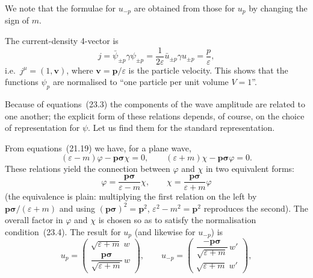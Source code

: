 We note that the formulae for $u_{-p}$ are obtained from those for $u_p$ by changing the sign of $m$.

The current-density 4-vector is
\begin{equation}
j = \bar\psi_{\pm p}\gamma\psi_{\pm p} = \frac{1}{2\varepsilon}\bar u_{\pm p}\gamma u_{\pm p} = \frac{p}{\varepsilon},
\tag{23.6}
\end{equation}
i.e.\ $j^\mu = (1, \mathbf{v})$, where $\mathbf{v} = \mathbf{p}/\varepsilon$ is the particle velocity. This shows that the functions $\psi_p$ are normalised to ``one particle per unit volume $V = 1$''.

Because of equations~(23.3) the components of the wave amplitude are related to one another; the explicit form of these relations depends, of course, on the choice of representation for $\psi$. Let us find them for the standard representation.

From equations~(21.19) we have, for a plane wave,
\begin{equation}
(\varepsilon - m)\varphi - \mathbf{p}\boldsymbol{\sigma}\chi = 0,\qquad (\varepsilon + m)\chi - \mathbf{p}\boldsymbol{\sigma}\varphi = 0.
\tag{23.7}
\end{equation}
These relations yield the connection between $\varphi$ and $\chi$ in two equivalent forms:
\begin{equation}
\varphi = \frac{\mathbf{p}\boldsymbol{\sigma}}{\varepsilon - m}\chi,\qquad \chi = \frac{\mathbf{p}\boldsymbol{\sigma}}{\varepsilon + m}\varphi
\tag{23.8}
\end{equation}
(the equivalence is plain: multiplying the first relation on the left by $\mathbf{p}\boldsymbol{\sigma}/(\varepsilon + m)$ and using $(\mathbf{p}\boldsymbol{\sigma})^2 = \mathbf{p}^2$, $\varepsilon^2 - m^2 = \mathbf{p}^2$ reproduces the second). The overall factor in $\varphi$ and $\chi$ is chosen so as to satisfy the normalisation condition~(23.4). The result for $u_p$ (and likewise for $u_{-p}$) is
\begin{equation}
u_p = \begin{pmatrix} \sqrt{\varepsilon + m}\;w\\ \dfrac{\mathbf{p}\boldsymbol{\sigma}}{\sqrt{\varepsilon + m}}\,w \end{pmatrix},\qquad u_{-p} = \begin{pmatrix} \dfrac{-\mathbf{p}\boldsymbol{\sigma}}{\sqrt{\varepsilon + m}}\,w'\\ \sqrt{\varepsilon + m}\;w' \end{pmatrix},
\tag{23.9}
\end{equation}

